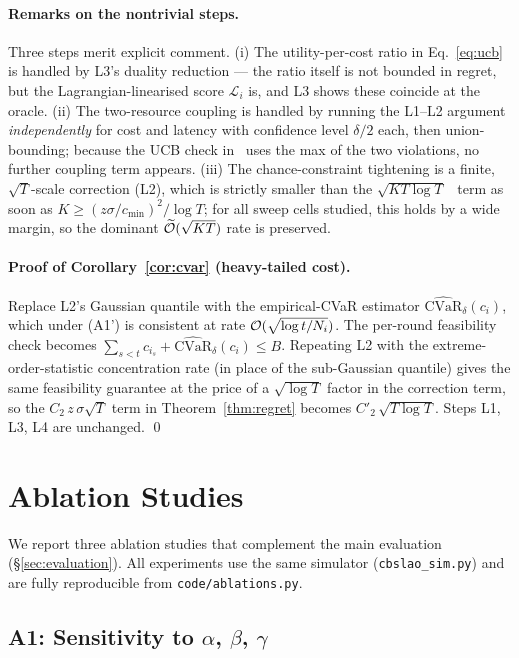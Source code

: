 \paragraph{Remarks on the nontrivial steps.}
Three steps merit explicit comment. (i) The utility-per-cost ratio in
Eq.~\eqref{eq:ucb} is handled by L3's duality reduction — the ratio
itself is not bounded in regret, but the Lagrangian-linearised score
$\mathcal{L}_i$ is, and L3 shows these coincide at the oracle. (ii) The
two-resource coupling is handled by running the L1--L2 argument
\emph{independently} for cost and latency with confidence level
$\delta/2$ each, then union-bounding; because the UCB check in
\CBUC~uses the max of the two violations, no further coupling term
appears. (iii) The chance-constraint tightening is a finite,
$\sqrt{T}$-scale correction (L2), which is strictly smaller than the
$\sqrt{KT\log T}$ \BwK~term as soon as $K \ge (z\sigma/c_{\min})^2/\log T$;
for all sweep cells studied, this holds by a wide margin, so the
dominant $\widetilde{\mathcal{O}}(\sqrt{KT})$ rate is preserved.

\paragraph{Proof of Corollary~\ref{cor:cvar} (heavy-tailed cost).}
Replace L2's Gaussian quantile with the empirical-CVaR estimator
$\widehat{\mathrm{CVaR}}_\delta(c_i)$, which under (A1') is consistent
at rate $\mathcal{O}(\sqrt{\log t / N_i})$. The per-round feasibility check
becomes $\sum_{s<t} c_{i_s} + \widehat{\mathrm{CVaR}}_\delta(c_i) \le B$.
Repeating L2 with the extreme-order-statistic concentration rate (in
place of the sub-Gaussian quantile) gives the same feasibility
guarantee at the price of a $\sqrt{\log T}$ factor in the correction
term, so the $C_2\,z\,\sigma\sqrt{T}$ term in Theorem~\ref{thm:regret}
becomes $C'_2\,\sqrt{T \log T}$. Steps L1, L3, L4 are unchanged.
\qed

\section{Ablation Studies}
\label{app:ablations}

We report three ablation studies that complement the main evaluation
(\S\ref{sec:evaluation}). All experiments use the same simulator
(\texttt{cbslao\_sim.py}) and are fully reproducible from
\texttt{code/ablations.py}.

\subsection{A1: Sensitivity to $\alpha$, $\beta$, $\gamma$}
\label{app:abl-abg}

